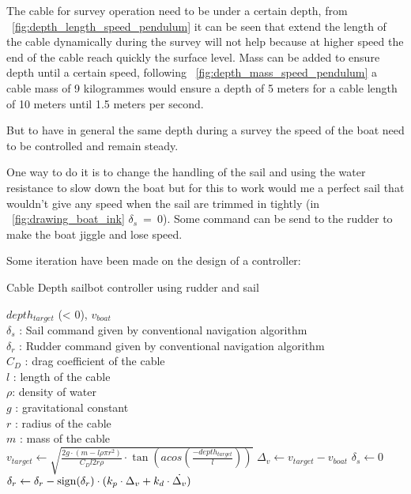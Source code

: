  The cable for survey operation need to be under a certain depth, from ~\ref{fig:depth_length_speed_pendulum} it can be seen that extend the length of the cable dynamically during the survey will not help because at higher speed the end of the cable reach quickly the surface level. Mass can be added to ensure depth until a certain speed, following ~\ref{fig:depth_mass_speed_pendulum} a cable mass of 9 kilogrammes would ensure a depth of 5 meters for a cable length of 10 meters until 1.5 meters per second.

But to have in general the same depth during a survey the speed of the boat need to be controlled and remain steady. 

One way to do it is to change the handling of the sail and using the water resistance to slow down the boat but for this to work would me a perfect sail that wouldn't give any speed when the sail are trimmed in tightly (in ~\ref{fig:drawing_boat_ink} $\delta_s~=~0$).
 Some command can be send to the rudder to make the boat jiggle and lose speed.
 
Some iteration have been made on the design of a controller: 
 
\begin{algorithm}[H]
\caption{Cable Depth sailbot controller using rudder and sail }
\label{alg:breakAlg1}
\begin{algorithmic}[1]
\REQUIRE $depth_{target}$ (< 0), $v_{boat}$\\
   $\delta_s$ : Sail command given by conventional navigation algorithm\\
   $\delta_r$ : Rudder command given by conventional navigation algorithm\\
   $C_D$ : drag coefficient of the cable \\
   $l$ : length of the cable\\
   $\rho$: density of water\\
   $g$ : gravitational constant\\
   $r$ : radius of the cable\\
   $m$ : mass of the cable\\
\STATE $v_{target} \leftarrow \sqrt{\frac{2 g \cdot (m - l \rho \pi r^2)}{C_D l 2 r \rho} \cdot \tan(acos(\frac{-depth_{target}}{l}))}$
\STATE $\Delta_{v} \leftarrow v_{target} - v_{boat}$
\STATE $\delta_s \leftarrow 0$
\STATE $\delta_r \leftarrow \delta_r - \textnormal{sign}(\delta_r) \cdot (k_p  \cdot \Delta_v + k_d \cdot \dot{\Delta_v})$
\ENDIF
\end{algorithmic}
\end{algorithm}
 
